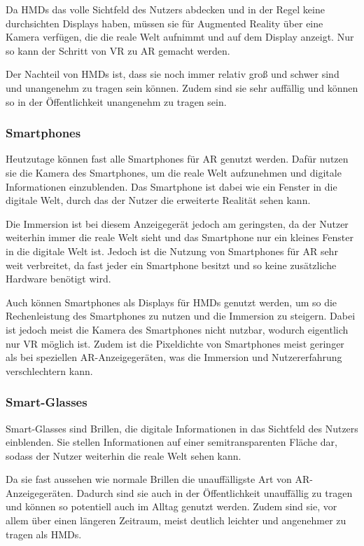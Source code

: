     Da HMDs das volle Sichtfeld des Nutzers abdecken und in der Regel keine durchsichten Displays haben, müssen sie für Augmented Reality über eine Kamera verfügen, die die reale Welt aufnimmt und auf dem Display anzeigt.
    Nur so kann der Schritt von VR zu AR gemacht werden.

    Der Nachteil von HMDs ist, dass sie noch immer relativ groß und schwer sind und unangenehm zu tragen sein können.
    Zudem sind sie sehr auffällig und können so in der Öffentlichkeit unangenehm zu tragen sein.

    \subsubsection{Smartphones}

    Heutzutage können fast alle Smartphones für AR genutzt werden.
    Dafür nutzen sie die Kamera des Smartphones, um die reale Welt aufzunehmen und digitale Informationen einzublenden.
    Das Smartphone ist dabei wie ein Fenster in die digitale Welt, durch das der Nutzer die erweiterte Realität sehen kann.

    Die Immersion ist bei diesem Anzeigegerät jedoch am geringsten, da der Nutzer weiterhin immer die reale Welt sieht und das Smartphone nur ein kleines Fenster in die digitale Welt ist.
    Jedoch ist die Nutzung von Smartphones für AR sehr weit verbreitet, da fast jeder ein Smartphone besitzt und so keine zusätzliche Hardware benötigt wird.

    Auch können Smartphones als Displays für HMDs genutzt werden, um so die Rechenleistung des Smartphones zu nutzen und die Immersion zu steigern.
    Dabei ist jedoch meist die Kamera des Smartphones nicht nutzbar, wodurch eigentlich nur VR möglich ist.
    Zudem ist die Pixeldichte von Smartphones meist geringer als bei speziellen AR-Anzeigegeräten, was die Immersion und Nutzererfahrung verschlechtern kann.

    \subsubsection{Smart-Glasses}

    Smart-Glasses sind Brillen, die digitale Informationen in das Sichtfeld des Nutzers einblenden.
    Sie stellen Informationen auf einer semitransparenten Fläche dar, sodass der Nutzer weiterhin die reale Welt sehen kann.

    Da sie fast aussehen wie normale Brillen die unauffälligste Art von AR-Anzeigegeräten.
    Dadurch sind sie auch in der Öffentlichkeit unauffällig zu tragen und können so potentiell auch im Alltag genutzt werden.
    Zudem sind sie, vor allem über einen längeren Zeitraum, meist deutlich leichter und angenehmer zu tragen als HMDs.